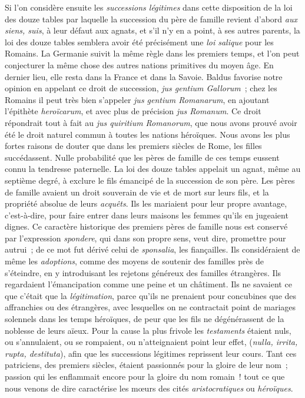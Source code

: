 \documentclass[french,twoside]{book} %
\begin{document}
Si l’on considère ensuite les {\itshape successions légitimes}  dans cette disposition de la loi des douze tables par laquelle la succession du père de famille revient d’abord {\itshape aux siens, suis}, à leur défaut aux agnats, et s’il n’y en a point, à ses autres parents, la loi des douze tables semblera avoir été précisément une {\itshape loi salique} pour les Romains. La Germanie suivit la même règle dans les premiers temps, et l’on peut conjecturer la même chose des autres nations primitives du moyen âge. En dernier lieu, elle resta dans la France et dans la Savoie. Baldus favorise notre opinion en appelant ce droit de succession, \emph{{\itshape jus gentium Gallorum}} ; chez les Romains il peut très bien s’appeler {\itshape jus gentium Romanarum}, en ajoutant l’épithète {\itshape heroïcarum}, et avec plus de précision {\itshape jus Romanum}. Ce droit répondrait tout à fait au {\itshape jus quiritium Romanorum}, que nous avons prouvé avoir été le droit naturel commun à toutes les nations héroïques. Nous avons les plus fortes raisons de douter que dans les premiers siècles de Rome, les filles succédassent. Nulle probabilité que les pères de famille de ces temps eussent connu la tendresse paternelle. La loi des douze tables appelait un agnat, même au septième degré, à exclure le fils émancipé de la succession de son père. Les pères de famille avaient un droit souverain de vie et de mort sur leurs fils, et la propriété absolue de leurs {\itshape acquêts}. Ils les mariaient pour leur propre avantage, c’est-à-dire, pour faire entrer dans leurs maisons les femmes qu’ils en jugeaient dignes. Ce caractère historique des premiers pères de famille  nous est conservé par l’expression {\itshape spondere}, qui dans son propre sens, veut dire, promettre pour autrui ; de ce mot fut dérivé celui de {\itshape sponsalia}, les fiançailles. Ils considéraient de même les {\itshape adoptions}, comme des moyens de soutenir des familles près de s’éteindre, en y introduisant les rejetons généreux des familles étrangères. Ils regardaient l’émancipation comme une peine et un châtiment. Ils ne savaient ce que c’était que la {\itshape légitimation}, parce qu’ils ne prenaient pour concubines que des affranchies ou des étrangères, avec lesquelles on ne contractait point de mariages solennels dans les temps héroïques, de peur que les fils ne dégénérassent de la noblesse de leurs aïeux. Pour la cause la plus frivole les {\itshape testaments} étaient nuls, ou s’annulaient, ou se rompaient, ou n’atteignaient point leur effet, ({\itshape nulla, irrita, rupta, destituta}), afin que les successions légitimes reprissent leur cours. Tant ces patriciens, des premiers siècles, étaient passionnés pour la gloire de leur nom ; passion qui les enflammait encore pour la gloire du nom romain ! tout ce que nous venons de dire caractérise les mœurs des cités {\itshape aristocratiques} ou {\itshape héroïques}.\par
\end{document}
